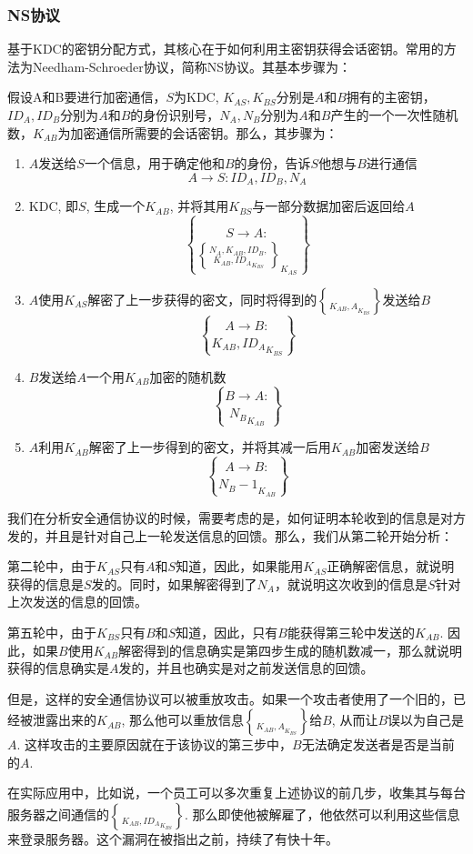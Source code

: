 \subsubsection{NS协议}
基于KDC的密钥分配方式，其核心在于如何利用主密钥获得会话密钥。常用的方法为Needham-Schroeder协议，简称NS协议。其基本步骤为：\par
假设A和B要进行加密通信，$S$为KDC, $K_{AS}, K_{BS}$分别是$A$和$B$拥有的主密钥，$ID_A, ID_B$分别为$A$和$B$的身份识别号，$N_A, N_B$分别为$A$和$B$产生的一个一次性随机数，$K_{AB}$为加密通信所需要的会话密钥。那么，其步骤为：
\begin{enumerate}
	\item $A$发送给$S$一个信息，用于确定他和$B$的身份，告诉$S$他想与$B$进行通信
	\[A\to S: ID_A, ID_B, N_A\]
	\item KDC, 即$S$, 生成一个$K_{AB}$, 并将其用$K_{BS}$与一部分数据加密后返回给$A$
	\[S\to A: \brace{N_A, K_{AB}, ID_B, \brace{K_{AB}, ID_A}_{K_{BS}}}_{K_{AS}}\]
	\item $A$使用$K_{AS}$解密了上一步获得的密文，同时将得到的$\brace{K_{AB}, A}_{K_{BS}}$发送给$B$
	\[A\to B: \brace{K_{AB}, ID_A}_{K_{BS}}\]
	\item $B$发送给$A$一个用$K_{AB}$加密的随机数
	\[B\to A: \brace{N_B}_{K_{AB}}\]
	\item $A$利用$K_{AB}$解密了上一步得到的密文，并将其减一后用$K_{AB}$加密发送给$B$
	\[A\to B: \brace{N_B - 1}_{K_{AB}}\]
\end{enumerate}

我们在分析安全通信协议的时候，需要考虑的是，如何证明本轮收到的信息是对方发的，并且是针对自己上一轮发送信息的回馈。那么，我们从第二轮开始分析：\par
第二轮中，由于$K_{AS}$只有$A$和$S$知道，因此，如果能用$K_{AS}$正确解密信息，就说明获得的信息是$S$发的。同时，如果解密得到了$N_A$，就说明这次收到的信息是$S$针对上次发送的信息的回馈。\par
第五轮中，由于$K_{BS}$只有$B$和$S$知道，因此，只有$B$能获得第三轮中发送的$K_{AB}$. 因此，如果$B$使用$K_{AB}$解密得到的信息确实是第四步生成的随机数减一，那么就说明获得的信息确实是$A$发的，并且也确实是对之前发送信息的回馈。\par
但是，这样的安全通信协议可以被重放攻击。如果一个攻击者使用了一个旧的，已经被泄露出来的$K_{AB}$, 那么他可以重放信息$\brace{K_{AB}, A}_{K_{BS}}$给$B$, 从而让$B$误以为自己是$A$. 这样攻击的主要原因就在于该协议的第三步中，$B$无法确定发送者是否是当前的$A$.\par
在实际应用中，比如说，一个员工可以多次重复上述协议的前几步，收集其与每台服务器之间通信的$\brace{K_{AB}, ID_A}_{K_{BS}}$. 那么即使他被解雇了，他依然可以利用这些信息来登录服务器。这个漏洞在被指出之前，持续了有快十年。